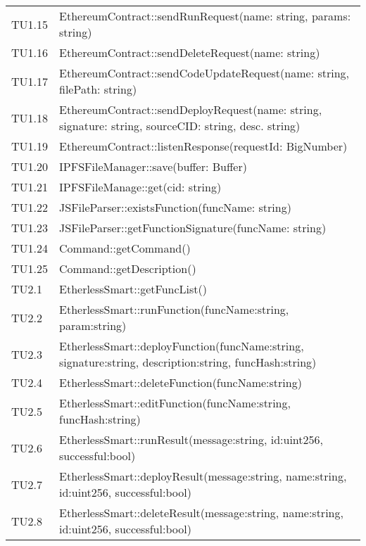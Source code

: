 \begin{longtable}{
		>{\centering}p{}
		>{}p{}}
	TU1.15 & EthereumContract::sendRunRequest(name: string, params: string) \\

	TU1.16 & EthereumContract::sendDeleteRequest(name: string) \\

	TU1.17 & EthereumContract::sendCodeUpdateRequest(name: string, filePath: string) \\

	TU1.18 & EthereumContract::sendDeployRequest(name: string, signature: string, sourceCID: string, desc. string) \\

	TU1.19 & EthereumContract::listenResponse(requestId: BigNumber) \\

	TU1.20 & IPFSFileManager::save(buffer: Buffer) \\

	TU1.21 & IPFSFileManage::get(cid: string) \\

	TU1.22 & JSFileParser::existsFunction(funcName: string) \\

	TU1.23 & JSFileParser::getFunctionSignature(funcName: string) \\

	TU1.24 & Command::getCommand() \\

	TU1.25 & Command::getDescription() \\
	
	TU2.1  &  EtherlessSmart::getFuncList()  \tabularnewline
	
	TU2.2  &  EtherlessSmart::runFunction(funcName:string, param:string)  \tabularnewline
	
	TU2.3  &  EtherlessSmart::deployFunction(funcName:string, signature:string, description:string, funcHash:string)  \tabularnewline
	
	TU2.4  &  EtherlessSmart::deleteFunction(funcName:string)  \tabularnewline
	
	TU2.5  &  EtherlessSmart::editFunction(funcName:string, funcHash:string)  \tabularnewline
	
	TU2.6  &  EtherlessSmart::runResult(message:string, id:uint256, successful:bool)  \tabularnewline
	
	TU2.7  &  EtherlessSmart::deployResult(message:string, name:string, id:uint256, successful:bool)  \tabularnewline
	
	TU2.8  &  EtherlessSmart::deleteResult(message:string, name:string, id:uint256, successful:bool)  \tabularnewline
	

\end{longtable}
